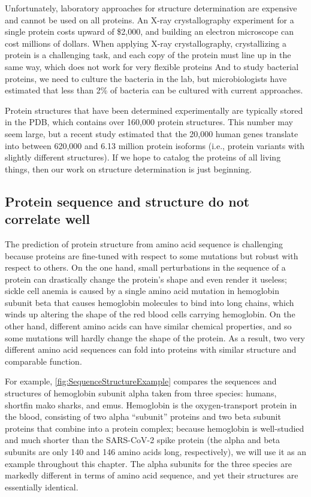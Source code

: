 Unfortunately, laboratory approaches for structure determination are expensive and cannot be used on all proteins. An X-ray crystallography experiment for a single protein costs upward of \$2,000, and building an electron microscope can cost millions of dollars. When applying X-ray crystallography, crystallizing a protein is a challenging task, and each copy of the protein must line up in the same way, which does not work for very flexible proteins  And to study bacterial proteins, we need to culture the bacteria in the lab, but microbiologists have estimated that less than 2\% of bacteria can be cultured with current approaches.

Protein structures that have been determined experimentally are typically stored in the PDB, which contains over 160,000 protein structures. This number may seem large, but a recent study estimated that the 20,000 human genes translate into between 620,000 and 6.13 million protein isoforms (i.e., protein variants with slightly different structures). If we hope to catalog the proteins of all living things, then our work on structure determination is just beginning.

\FloatBarrier
{}
\subsection{Protein sequence and structure do not correlate well}

The prediction of protein structure from amino acid sequence is challenging because proteins are fine-tuned with respect to some mutations but robust with respect to others. On the one hand, small perturbations in the sequence of a protein can drastically change the protein's shape and even render it useless; sickle cell anemia is caused by a single amino acid mutation in hemoglobin subunit beta that causes hemoglobin molecules to bind into long chains, which winds up altering the shape of the red blood cells carrying hemoglobin. On the other hand, different amino acids can have similar chemical properties, and so some mutations will hardly change the shape of the protein. As a result, two very different amino acid sequences can fold into proteins with similar structure and comparable function.

For example, \autoref{fig:SequenceStructureExample} compares the sequences and structures of hemoglobin subunit alpha taken from three species: humans, shortfin mako sharks, and emus. Hemoglobin is the oxygen-transport protein in the blood, consisting of two alpha ``subunit'' proteins and two beta subunit proteins that combine into a protein complex; because hemoglobin is well-studied and much shorter than the SARS-CoV-2 spike protein (the alpha and beta subunits are only 140 and 146 amino acids long, respectively), we will use it as an example throughout this chapter. The alpha subunits for the three species are markedly different in terms of amino acid sequence, and yet their structures are essentially identical.\\

